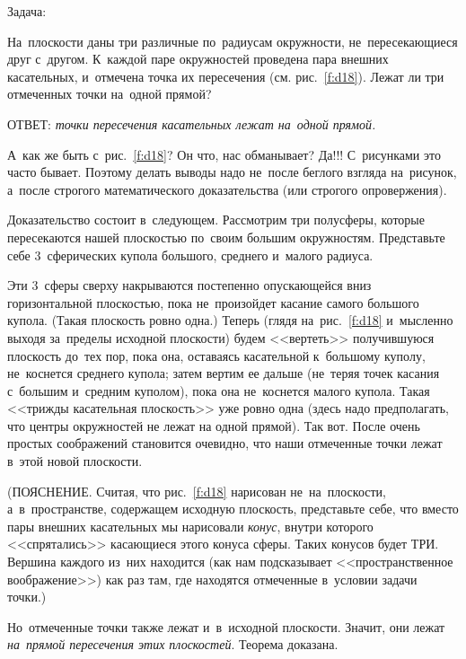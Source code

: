 Задача:

На~плоскости даны три различные по~радиусам окружности, не~пересекающиеся друг с~другом. К~каждой
паре окружностей проведена пара внешних касательных, и~отмечена точка их пересечения (см.
рис.~\ref{f:d18}). Лежат ли три отмеченных точки на~одной прямой?


ОТВЕТ: \textit{точки пересечения касательных лежат на~одной прямой.}

А~как же быть с~рис.~\ref{f:d18}? Он что, нас обманывает? Да!!! С~рисунками это часто бывает. Поэтому делать
выводы надо не~после беглого взгляда на~рисунок, а~после строгого математического доказательства
(или строгого опровержения).

Доказательство состоит в~следующем. Рассмотрим три полусферы, которые пересекаются нашей плоскостью
по~своим большим окружностям. Представьте себе 3~сферических купола большого, среднего и~малого
радиуса.

Эти 3~сферы сверху накрываются постепенно опускающейся вниз горизонтальной плоскостью, пока
не~произойдет касание самого большого купола. (Такая плоскость ровно одна.) Теперь (глядя на~рис.~\ref{f:d18}
и~мысленно выходя за~пределы исходной плоскости) будем <<вертеть>> получившуюся плоскость до~тех
пор, пока она, оставаясь касательной к~большому куполу, не~коснется среднего купола; затем вертим
ее дальше (не~теряя точек касания с~большим и~средним куполом), пока она не~коснется малого купола.
Такая <<трижды касательная плоскость>> уже ровно одна (здесь надо предполагать, что центры окружностей не лежат на одной прямой).
Так вот. После очень простых соображений
становится очевидно, что наши отмеченные точки лежат в~этой новой плоскости.

(ПОЯСНЕНИЕ. Считая, что рис.~\ref{f:d18} нарисован не~на~плоскости, а~в~пространстве, содержащем исходную
плоскость, представьте себе, что вместо пары внешних касательных мы нарисовали \textit{конус}, внутри
которого <<спрятались>> касающиеся этого конуса сферы. Таких конусов будет ТРИ. Вершина каждого
из~них находится (как нам подсказывает <<пространственное воображение>>) как раз там, где находятся
отмеченные в~условии задачи точки.)

Но~отмеченные точки также лежат и~в~исходной плоскости. Значит, они лежат \textit{на~прямой пересечения
этих плоскостей}. Теорема доказана.

